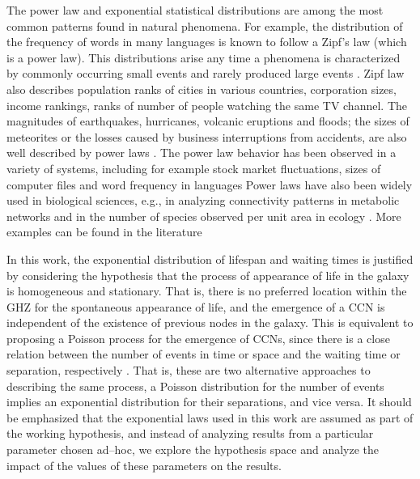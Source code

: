 \documentclass[crop]{CSLB}
\newcommand{\ceti}{CCN}
\newcommand{\cetis}{CCNs}
\begin{document}
The power law and exponential statistical distributions are among the
most common patterns found in natural phenomena.
%
For example, the distribution of the frequency of words in many
languages is known to follow a Zipf's law (which is a power law).
%
This distributions arise any time a phenomena is characterized by
commonly occurring small events and rarely produced large events
\citep[e.g. ][]{adamic_zipf_2000}.
%
Zipf law also describes population ranks of cities in various
countries, corporation sizes, income rankings, ranks of number of
people watching the same TV channel.
%
The magnitudes of earthquakes, hurricanes, volcanic eruptions and
floods; the sizes of meteorites or the losses caused by business
interruptions from accidents, are also well described by power laws
\citep{sornette_critical_2006, benguigui_classificacion_2016}.
%
The power law behavior has been observed in a variety of systems,
including for example stock market fluctuations, sizes of computer
files and word frequency in languages \citep{mitzenmacher_brief_2004,
newman_power_2005, simkin_theory_2006}
%
Power laws have also been widely used in biological sciences, e.g., in
analyzing connectivity patterns in metabolic networks
\citep{jeong_large_2000} and in the number of species observed per
unit area in ecology \citep{martin_origin_2006, frank_common_2009}.
% 
More examples can be found in the literature
\citep{martin_origin_2006, maccone_KLT_2010, barabasi_scale_2009,
maccone_evolution_2014, maccone_lognormals_2014,
benguigui_classificacion_2016}
 


In this work, the exponential distribution of lifespan and waiting
times is justified by considering the hypothesis that the process of
appearance of life in the galaxy is homogeneous and stationary.
%
That is, there is no preferred location within the GHZ for the
spontaneous appearance of life, and the emergence of a \ceti{} is
independent of the existence of previous nodes in the galaxy.
%            
This is equivalent to proposing a Poisson process for the emergence of
\cetis{}, since there is a close relation between the number of events
in time or space and the waiting time or separation, respectively
\citep[e.g., ][]{ross_simulation_2012}.
%
That is, these are two alternative approaches to describing the same
process, a Poisson distribution for the number of events implies an
exponential distribution for their separations, and vice versa.
%
It should be emphasized that the exponential laws used in this work
are assumed as part of the working hypothesis, and instead of
analyzing results from a particular parameter chosen ad--hoc, we
explore the hypothesis space and analyze the impact of the values of
these parameters on the results.
 
\end{document}
